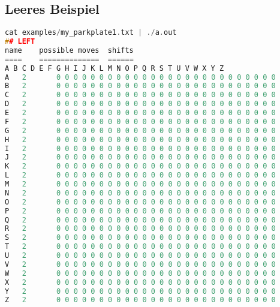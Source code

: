 \documentclass[a4paper,10pt,ngerman]{scrartcl}
\begin{document}
\subsection*{Leeres Beispiel}
\begin{lstlisting}[language=C++]
cat examples/my_parkplate1.txt | ./a.out
## LEFT
name	possible moves	shifts
====	==============	======
A B C D E F G H I J K L M N O P Q R S T U V W X Y Z
A	2		0 0 0 0 0 0 0 0 0 0 0 0 0 0 0 0 0 0 0 0 0 0 0 0 0 0
B	2		0 0 0 0 0 0 0 0 0 0 0 0 0 0 0 0 0 0 0 0 0 0 0 0 0 0
C	2		0 0 0 0 0 0 0 0 0 0 0 0 0 0 0 0 0 0 0 0 0 0 0 0 0 0
D	2		0 0 0 0 0 0 0 0 0 0 0 0 0 0 0 0 0 0 0 0 0 0 0 0 0 0
E	2		0 0 0 0 0 0 0 0 0 0 0 0 0 0 0 0 0 0 0 0 0 0 0 0 0 0
F	2		0 0 0 0 0 0 0 0 0 0 0 0 0 0 0 0 0 0 0 0 0 0 0 0 0 0
G	2		0 0 0 0 0 0 0 0 0 0 0 0 0 0 0 0 0 0 0 0 0 0 0 0 0 0
H	2		0 0 0 0 0 0 0 0 0 0 0 0 0 0 0 0 0 0 0 0 0 0 0 0 0 0
I	2		0 0 0 0 0 0 0 0 0 0 0 0 0 0 0 0 0 0 0 0 0 0 0 0 0 0
J	2		0 0 0 0 0 0 0 0 0 0 0 0 0 0 0 0 0 0 0 0 0 0 0 0 0 0
K	2		0 0 0 0 0 0 0 0 0 0 0 0 0 0 0 0 0 0 0 0 0 0 0 0 0 0
L	2		0 0 0 0 0 0 0 0 0 0 0 0 0 0 0 0 0 0 0 0 0 0 0 0 0 0
M	2		0 0 0 0 0 0 0 0 0 0 0 0 0 0 0 0 0 0 0 0 0 0 0 0 0 0
N	2		0 0 0 0 0 0 0 0 0 0 0 0 0 0 0 0 0 0 0 0 0 0 0 0 0 0
O	2		0 0 0 0 0 0 0 0 0 0 0 0 0 0 0 0 0 0 0 0 0 0 0 0 0 0
P	2		0 0 0 0 0 0 0 0 0 0 0 0 0 0 0 0 0 0 0 0 0 0 0 0 0 0
Q	2		0 0 0 0 0 0 0 0 0 0 0 0 0 0 0 0 0 0 0 0 0 0 0 0 0 0
R	2		0 0 0 0 0 0 0 0 0 0 0 0 0 0 0 0 0 0 0 0 0 0 0 0 0 0
S	2		0 0 0 0 0 0 0 0 0 0 0 0 0 0 0 0 0 0 0 0 0 0 0 0 0 0
T	2		0 0 0 0 0 0 0 0 0 0 0 0 0 0 0 0 0 0 0 0 0 0 0 0 0 0
U	2		0 0 0 0 0 0 0 0 0 0 0 0 0 0 0 0 0 0 0 0 0 0 0 0 0 0
V	2		0 0 0 0 0 0 0 0 0 0 0 0 0 0 0 0 0 0 0 0 0 0 0 0 0 0
W	2		0 0 0 0 0 0 0 0 0 0 0 0 0 0 0 0 0 0 0 0 0 0 0 0 0 0
X	2		0 0 0 0 0 0 0 0 0 0 0 0 0 0 0 0 0 0 0 0 0 0 0 0 0 0
Y	2		0 0 0 0 0 0 0 0 0 0 0 0 0 0 0 0 0 0 0 0 0 0 0 0 0 0
Z	2		0 0 0 0 0 0 0 0 0 0 0 0 0 0 0 0 0 0 0 0 0 0 0 0 0 0



\end{lstlisting}
\end{document}
